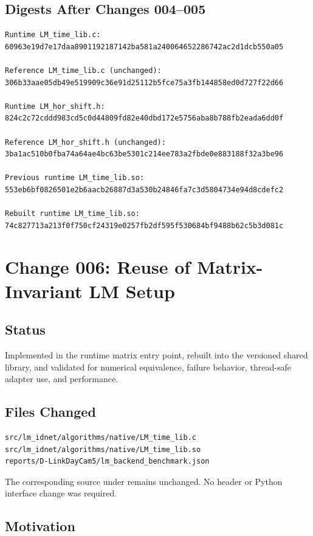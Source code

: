 \documentclass[11pt,a4paper]{article}
\begin{document}
\subsection{Digests After Changes 004--005}

\begin{verbatim}
Runtime LM_time_lib.c:
60963e19d7e17daa8901192187142ba581a240064652286742ac2d1dcb550a05

Reference LM_time_lib.c (unchanged):
306b33aae05db49e519909c36e91d25112b5fce75a3fb144858ed0d727f22d66

Runtime LM_hor_shift.h:
824c2c72cddd983cd5c0d44809fd82e40dbd172e5756aba8b788fb2eada6dd0f

Reference LM_hor_shift.h (unchanged):
3ba1ac510b0fba74a64ae4bc63be5301c214ee783a2fbde0e883188f32a3be96

Previous runtime LM_time_lib.so:
553eb6bf0826501e2b6aacb26887d3a530b24846fa7c3d5804734e94d8cdefc2

Rebuilt runtime LM_time_lib.so:
74c827713a213f0f750cf24319e0257fb2df595f530684bf9488b62c5b3d081c
\end{verbatim}

\section{Change 006: Reuse of Matrix-Invariant LM Setup}

\subsection{Status}

Implemented in the runtime matrix entry point, rebuilt into the versioned
shared library, and validated for numerical equivalence, failure behavior,
thread-safe adapter use, and performance.

\subsection{Files Changed}

\begin{verbatim}
src/lm_idnet/algorithms/native/LM_time_lib.c
src/lm_idnet/algorithms/native/LM_time_lib.so
reports/D-LinkDayCam5/lm_backend_benchmark.json
\end{verbatim}

The corresponding source under  remains unchanged.
No header or Python interface change was required.

\subsection{Motivation}
\end{document}
